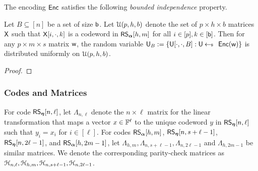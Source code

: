 The encoding $\enc$ satisfies the following {\em bounded independence} property. %
\begin{lemma}\label{lem:boundedindependence}
	Let $B\subseteq [n]$ be a set of size $\bi$. Let $\mc{U}(p,h,b)$ denote the set of $p\times h\times b$ matrices $\matx$ such that $\matx[i,\cdot,k]$ is a codeword in $\rsc{\alpha}{h,m}$ for all $i\in [p],k\in [\bi]$. Then for any $p\times m\times s$ matrix $\wit$, the random variable $\ewit_B := \{\ewit[\cdot,\cdot,B]: \ewit\sample \enc(\wit)\}$ is distributed uniformly on $\mc{U}(p,h,b)$.
\end{lemma}

\begin{proof}
	
	
\end{proof}

\subsubsection{Codes and Matrices}\label{subsec:codesandmatrices}
For code $\rsc{\eta}{n,\ell}$, let $\Lambda_{n,\ell}$ denote the $n\times \ell$ matrix for the linear transformation that maps a vector $x\in \FF^\ell$ to the unique codeword $y$ in  $\rsc{\eta}{n,\ell}$ such that $y_i=x_i$ for $i\in [\ell]$. For codes  $\rsc{\alpha}{h,m}$, $\rsc{\eta}{n,s+\ell-1}$, $\rsc{\eta}{n,2\ell-1}$, and $\rsc{\alpha}{h,2m-1}$, let
$\Lambda_{h,m},\Lambda_{n,s+\ell-1},\Lambda_{n,2\ell-1}$ and $\Lambda_{h,2m-1}$ be similar matrices. We denote the corresponding parity-check matrices as $\mc{H}_{n,\ell},\mc{H}_{h,m},\mc{H}_{n,s+\ell-1},\mc{H}_{n,2\ell-1}$. 

